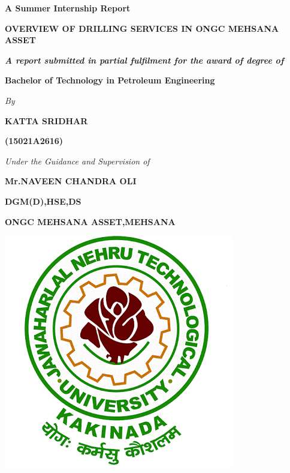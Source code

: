 \documentclass[11pt,a4paper]{report}
\makeatletter
\newcommand\frontmatter{%
    \cleardoublepage
  \pagenumbering{roman}}
\makeatother
\begin{document}
\frontmatter

\begin{titlepage}
\begin{center}

\textbf{A Summer Internship Report}

\vspace{1em}

\large \textbf{OVERVIEW OF DRILLING SERVICES IN ONGC MEHSANA ASSET}

\vspace{3em}

\large \textit{\textbf{A report submitted in partial fulfilment for the award of degree of}}

\vspace{1em}

\textbf{Bachelor of Technology in Petroleum Engineering}

\vspace{3em}

\textit{By}

\vspace{1em}

\textbf{KATTA SRIDHAR}

\vspace{0.5em}

\textbf{(15021A2616)}

\vspace{2em}

\textit{Under the Guidance and Supervision of}

\vspace{1em}

\textbf{Mr.NAVEEN CHANDRA OLI}

\vspace{0.5em}

\textbf{DGM(D),HSE,DS}

\vspace{0.5em}

\textbf{ONGC MEHSANA ASSET,MEHSANA}

\vspace{0.5em}

\vspace{2em}

\includegraphics[scale=0.4]{images/jntuk1}


\end{center}
\end{titlepage}
\end{document}
